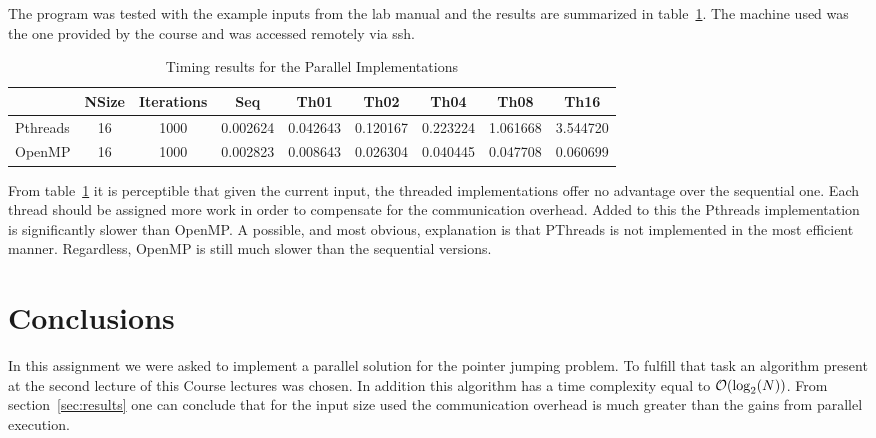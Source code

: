 The program was tested with the example inputs from the lab manual and the results are summarized in table~\ref{tbl:results}. The machine used was the one provided by the course and was accessed remotely via ssh.

\begin{table}[H]
\centering
\begin{tabular}{lcccccccc}
         & NSize & Iterations & Seq      & Th01      & Th02      & Th04      & Th08      & Th16
\\\midrule
Pthreads	& 16 &      1000 & 0.002624 &  0.042643 &  0.120167 &  0.223224 &  1.061668 &  3.544720\\
OpenMP		& 16 &      1000 & 0.002823 &  0.008643 &  0.026304 &  0.040445 &  0.047708 &  0.060699
\end{tabular}
\caption{Timing results for the Parallel Implementations}
\label{tbl:results}
\end{table}

From table~\ref{tbl:results} it is perceptible that given the current input, the threaded implementations offer no advantage over the sequential one. Each thread should be assigned more work in order to compensate for the communication overhead. Added to this the Pthreads implementation is significantly slower than OpenMP. A possible, and most obvious, explanation is that PThreads is not implemented in the most efficient manner. Regardless, OpenMP is still much slower than the sequential versions.

\section{Conclusions}

In this assignment we were asked to implement a parallel solution for the pointer jumping problem. To fulfill that task an algorithm present at the second lecture of this Course lectures was chosen. In addition this algorithm has a time complexity equal to  $\mathcal{O}(\log_2(N))$.
From section~\ref{sec:results} one can conclude that for the input size used the communication overhead is much greater than the gains from parallel execution.
